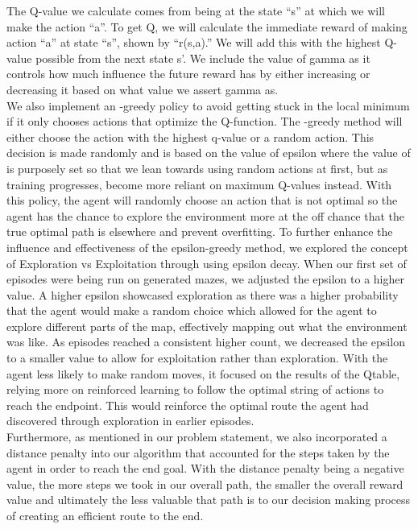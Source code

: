 \documentclass{article}
\begin{document}
The Q-value we calculate comes from being at the state “s” at which we will make the action “a”. To get Q, we will calculate the immediate reward of making action “a” at state “s”, shown by “r(s,a).” We will add this with the highest Q-value possible from the next state s’. We include the value of gamma as it controls how much influence the future reward has by either increasing or decreasing it based on what value we assert gamma as. \\
We also implement an \textepsilon -greedy policy to avoid getting stuck in the local minimum if it only chooses actions that optimize the Q-function. The \textepsilon -greedy method will either choose the action with the highest q-value or a random action. This decision is made randomly and is based on the value of epsilon where the value of \textepsilon is purposely set so that we lean towards using random actions at first, but as training progresses, become more reliant on maximum Q-values instead. With this policy, the agent will randomly choose an action that is not optimal so the agent has the chance to explore the environment more at the off chance that the true optimal path is elsewhere and prevent overfitting. To further enhance the influence and effectiveness of the epsilon-greedy method, we explored the concept of Exploration vs Exploitation through using epsilon decay. When our first set of episodes were being run on generated mazes, we adjusted the epsilon to a higher value. A higher epsilon showcased exploration as there was a higher probability that the agent would make a random choice which allowed for the agent to explore different parts of the map, effectively mapping out what the environment was like. As episodes reached a consistent higher count, we decreased the epsilon to a smaller value to allow for exploitation rather than exploration. With the agent less likely to make random moves, it focused on the results of the Qtable, relying more on reinforced learning to follow the optimal string of actions to reach the endpoint. This would reinforce the optimal route the agent had discovered through exploration in earlier episodes. \\
Furthermore, as mentioned in our problem statement, we also incorporated a distance penalty into our algorithm that accounted for the steps taken by the agent in order to reach the end goal. With the distance penalty being a negative value, the more steps we took in our overall path, the smaller the overall reward value and ultimately the less valuable that path is to our decision making process of creating an efficient route to the end. 
\end{document}
